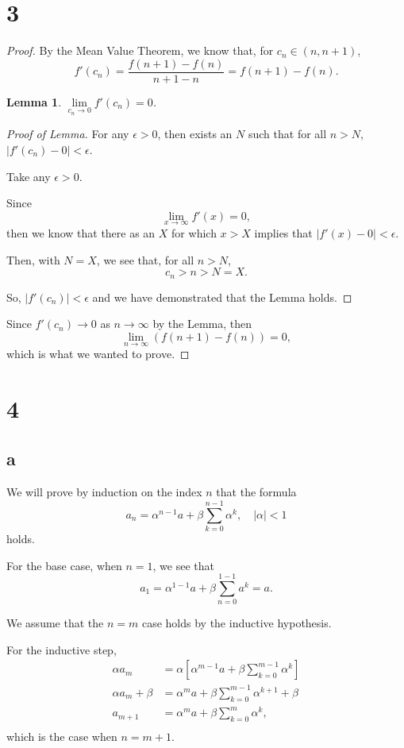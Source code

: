 \documentclass{article}
\newtheorem*{lemma}{Lemma}
\begin{document}
\section*{3}
\begin{proof}
By the Mean Value Theorem, we know that, for $c_n\in(n,n+1)$, \[f'(c_n)=\frac{f(n+1)-f(n)}{n+1-n}=f(n+1)-f(n).\]

\begin{lemma}
$\lim\limits_{c_n\to0} f'(c_n)=0$.
\end{lemma}
\begin{proof}[Proof of Lemma]
    For any $\epsilon>0$, then exists an $N$ such that for all $n>N$, $|f'(c_n)-0|<\epsilon$.
    
    Take any $\epsilon>0$.

    Since \[\lim\limits_{x\to\infty} f'(x) = 0,\] then we know that there as an $X$ for which $x>X$ implies that $|f'(x)-0|<\epsilon$.

    Then, with $N=X$, we see that, for all $n>N$, \[c_n>n>N=X.\]

    So, $|f'(c_n)|<\epsilon$ and we have demonstrated that the Lemma holds.
\end{proof}

Since $f'(c_n)\to0$ as $n\to\infty$ by the Lemma, then \[\lim\limits_{n\to\infty} (f(n+1)-f(n))=0,\] which is what we wanted to prove.
    
\end{proof}


\section*{4}

\subsection*{a}
We will prove by induction on the index $n$ that the formula \[a_n=\alpha^{n-1}a+\beta\sum\limits_{k=0}^{n-1}\alpha^k, \quad |\alpha|<1\] holds.

For the base case, when $n=1$, we see that
\[a_1=\alpha^{1-1}a+\beta\sum\limits_{n=0}^{1-1}a^k=a.\]

We assume that the $n=m$ case holds by the inductive hypothesis.

For the inductive step, 
\begin{align*}
    \alpha a_m&=\alpha \left[\alpha^{m-1}a+\beta\sum\limits_{k=0}^{m-1}\alpha^k\right] \\
    \alpha a_m + \beta &= \alpha^{m}a + \beta\sum\limits_{k=0}^{m-1}\alpha^{k+1}+\beta \\
    a_{m+1}&= \alpha^{m}a+\beta\sum\limits_{k=0}^{m}\alpha^{k}, \\
\end{align*}
which is the case when $n=m+1$.
\end{document}
